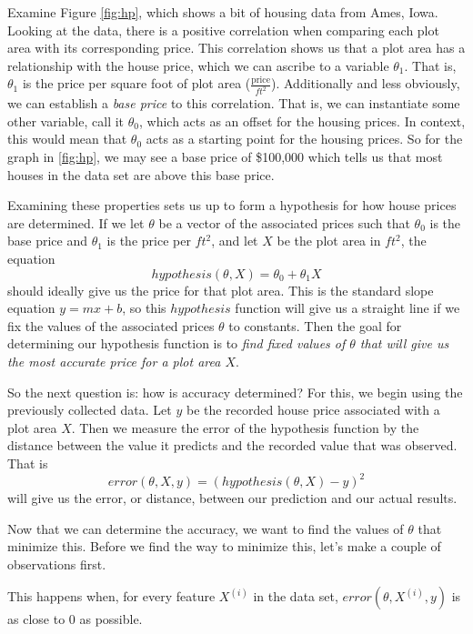 \documentclass{book}[a5paper]
\begin{document}
Examine Figure \ref{fig:hp}, which shows a bit of housing data from
Ames, Iowa. Looking at the data, there is a positive correlation when comparing each plot area with its corresponding price. This correlation shows us that a plot area has a relationship with the house price, which we can ascribe to a variable $\theta_1$. That is, $\theta_1$ is the price per square foot of plot area ($\frac{\text{price}}{ft^2}$). Additionally and less obviously, we can establish a \emph{base price} to this correlation. That is, we can instantiate some other variable, call it $\theta_0$, which acts as an offset for the housing prices. In context, this would mean that $\theta_0$ acts as a starting point for the housing prices. So for the graph in \ref{fig:hp}, we may see a base price of \$100,000 which tells us that most houses in the data set are above this base price.

Examining these properties sets us up to form a hypothesis for how house prices
are determined.  If we let $\theta$ be a vector of the associated prices such that
$\theta_0$ is the base price and $\theta_1$ is the price per $ft^2$, and let $X$
be the plot area in $ft^2$, the equation
\begin{equation}
    hypothesis(\theta, X) = \theta_0 + \theta_1X
\end{equation}
should ideally give us the price for that plot area. This is the standard slope
equation $y=mx+b$, so this $hypothesis$ function will give us a straight line if
we fix the values of the associated prices $\theta$ to constants. Then the goal
for determining our hypothesis function is to \emph{find fixed values of
$\theta$ that will give us the most accurate price for a plot area $X$}.

So the next question is: how is accuracy determined? For this, we begin using
the previously collected data. Let $y$ be the recorded house price
associated with a plot area $X$. Then we measure the error of the hypothesis
function by the distance between the value it predicts and the recorded value
that was observed. That is
\begin{equation}
    error(\theta, X, y) = (hypothesis(\theta, X) - y)^2
\end{equation}
will give us the error, or distance, between our prediction and our actual
results.

Now that we can determine the accuracy, we want to find the values of $\theta$
that minimize this. Before we find the way to minimize this, let's make a couple
of observations first.


This happens when, for every feature $X^{(i)}$ in the data
set, $error(\theta, X^{(i)}, y)$ is as close to 0 as possible.
\end{document}
